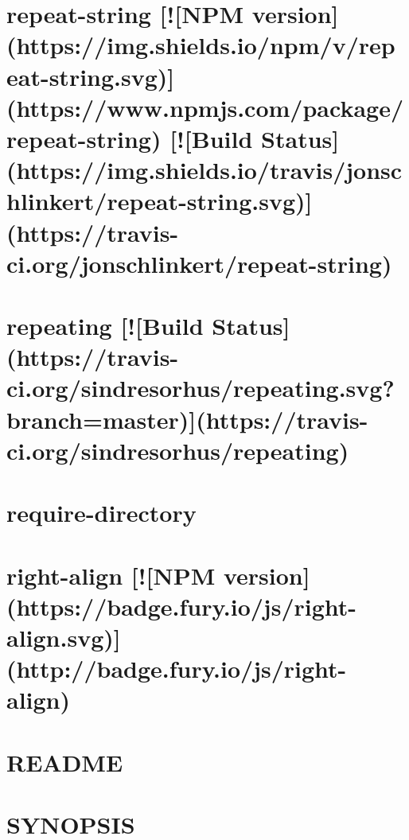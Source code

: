 \documentclass[twoside]{book}
\newcommand{\+}{\discretionary{\mbox{\scriptsize$\hookleftarrow$}}{}{}}
\begin{document}
\chapter{repeat-\/string \mbox{[}!\mbox{[}N\+PM version\mbox{]}(https\+://img.shields.\+io/npm/v/repeat-\/string.svg)\mbox{]}(https\+://www.npmjs.\+com/package/repeat-\/string) \mbox{[}!\mbox{[}Build Status\mbox{]}(https\+://img.shields.\+io/travis/jonschlinkert/repeat-\/string.svg)\mbox{]}(https\+://travis-\/ci.org/jonschlinkert/repeat-\/string)}
\label{md_app_web_node_modules_repeat-string__r_e_a_d_m_e}

\chapter{repeating \mbox{[}!\mbox{[}Build Status\mbox{]}(https\+://travis-\/ci.org/sindresorhus/repeating.svg?branch=master)\mbox{]}(https\+://travis-\/ci.org/sindresorhus/repeating)}
\label{md_app_web_node_modules_repeating_readme}

\chapter{require-\/directory}
\label{md_app_web_node_modules_require-directory__r_e_a_d_m_e}

\chapter{right-\/align \mbox{[}!\mbox{[}N\+PM version\mbox{]}(https\+://badge.fury.\+io/js/right-\/align.svg)\mbox{]}(http\+://badge.fury.\+io/js/right-\/align)}
\label{md_app_web_node_modules_right-align__r_e_a_d_m_e}

\chapter{R\+E\+A\+D\+ME}
\label{md_app_web_node_modules_rimraf__r_e_a_d_m_e}

\chapter{S\+Y\+N\+O\+P\+S\+IS}
\label{md_app_web_node_modules_rlp__r_e_a_d_m_e}

\end{document}
